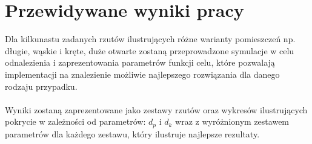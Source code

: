 \documentclass[12pt,a4paper]{article}
\begin{document}
\section{Przewidywane wyniki pracy}
Dla kilkunastu zadanych rzutów ilustrujących różne warianty pomieszczeń np. długie, wąskie i kręte,
duże otwarte zostaną przeprowadzone symulacje w celu odnalezienia i zaprezentowania
parametrów funkcji celu, które pozwalają implementacji na znalezienie możliwie
najlepszego rozwiązania dla danego rodzaju przypadku. \\ \\
Wyniki zostaną zaprezentowane jako zestawy rzutów oraz wykresów
ilustrujących pokrycie w zależności od parametrów: $d_p$ i $d_k$ wraz z wyróżnionym zestawem
parametrów dla każdego zestawu, który ilustruje najlepsze rezultaty.
\end{document}
